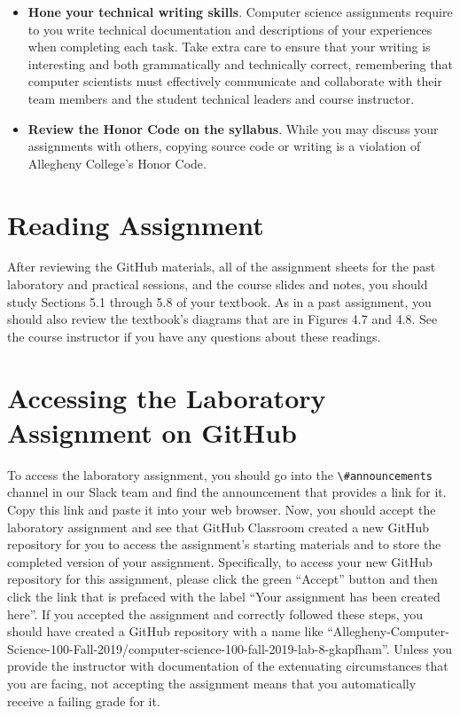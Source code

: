 \documentclass[11pt]{article}
\newcommand{\channel}[1]{\lstinline{#1}}
\begin{document}
\begin{itemize}
\item {\bf Hone your technical writing skills}. Computer science assignments
  require to you write technical documentation and descriptions of your
  experiences when completing each task. Take extra care to ensure that your
  writing is interesting and both grammatically and technically correct,
  remembering that computer scientists must effectively communicate and
  collaborate with their team members and the student technical leaders and
  course instructor.

\item {\bf Review the Honor Code on the syllabus}. While you may discuss your
  assignments with others, copying source code or writing is a violation of
  Allegheny College's Honor Code.

\end{itemize}

\section*{Reading Assignment}

After reviewing the GitHub materials, all of the assignment sheets for the past
laboratory and practical sessions, and the course slides and notes, you should
study Sections 5.1 through 5.8 of your textbook. As in a past assignment, you
should also review the textbook's diagrams that are in Figures 4.7 and 4.8. See
the course instructor if you have any questions about these readings.

\section*{Accessing the Laboratory Assignment on GitHub}

To access the laboratory assignment, you should go into the
\channel{\#announcements} channel in our Slack team and find the announcement
that provides a link for it. Copy this link and paste it into your web browser.
Now, you should accept the laboratory assignment and see that GitHub Classroom
created a new GitHub repository for you to access the assignment's starting
materials and to store the completed version of your assignment. Specifically,
to access your new GitHub repository for this assignment, please click the green
``Accept'' button and then click the link that is prefaced with the label ``Your
assignment has been created here''. If you accepted the assignment and correctly
followed these steps, you should have created a GitHub repository with a name
like
``Allegheny-Computer-Science-100-Fall-2019/computer-science-100-fall-2019-lab-8-gkapfham''.
Unless you provide the instructor with documentation of the extenuating
circumstances that you are facing, not accepting the assignment means that you
automatically receive a failing grade for it.
\end{document}
